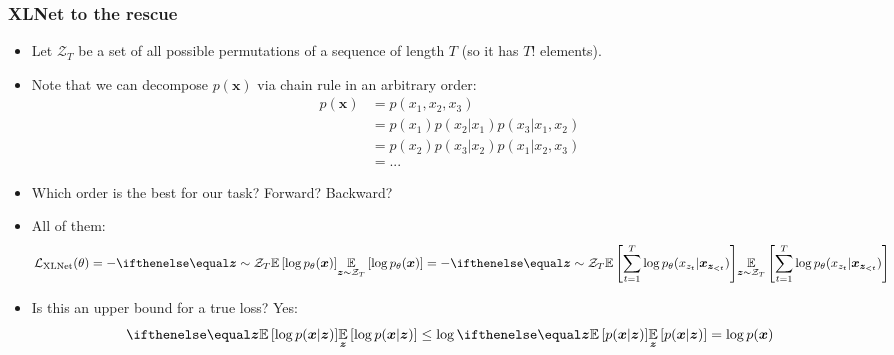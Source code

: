 \documentclass[10pt]{beamer}
\begin{document}
\begin{frame}
    \frametitle{XLNet to the rescue}
    \begin{itemize}
        \item\pause Let $\mathcal{Z}_T$ be a set of all possible permutations of a sequence of length $T$ (so it has $T!$ elements).
        \item\pause Note that we can decompose $p(\bm x)$ via chain rule in an arbitrary order:
        \begin{equation*}
        \begin{split}
        p(\bm x) &= p(x_1, x_2, x_3) \\
        &= p(x_1) p(x_2 | x_1) p(x_3 | x_1, x_2) \\
        &= p(x_2) p(x_3 | x_2) p(x_1 | x_2, x_3) \\
        &= ...
        \end{split}
        \end{equation*}
        
        \item\pause Which order is the best for our task? Forward? Backward?
        \item\pause All of them:
        \[
        \mathcal{L}_{\text{XLNet}}(\theta) = -\expect[\bm z \sim \mathcal{Z}_T]{\log p_\theta(\bm x)} = -\expect[\bm z \sim \mathcal{Z}_T]{\sum_{t=1}^T \log p_\theta(x_{z_t} | \bm x_{\bm z_{< t}})}
        \]
        \item\pause Is this an upper bound for a true loss? Yes:
        \[
        \expect[\bm z]{\log p(\bm x | \bm z)} \leq \log \expect[\bm z]{p(\bm x | \bm z)} = \log p(\bm x)
        \]
    \end{itemize}
\end{frame}
\end{document}
